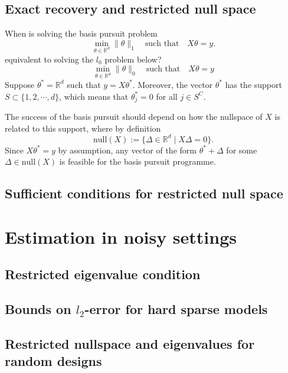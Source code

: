 \documentclass[10pt,handout,english]{beamer}
\newcommand{\R}{\mathbb{R}}
\begin{document}
\subsection{Exact recovery and restricted null space}

\begin{frame}[allowframebreaks]
When is solving the basis pursuit problem
\[
\min_{\theta\in\R^d}\lVert \theta\rVert_1\quad\text{such that}\quad X\theta=y.
\]
equivalent to solving the $l_0$ problem below?
\[
\min_{\theta\in\R^d}\lVert \theta\rVert_0\quad\text{such that}\quad X\theta=y
\]
Suppose $\theta^*=\R^d$ such that $y=X\theta^*$. Moreover, the vector $\theta^*$ has the support $S\subset\{1,2,\cdots,d\}$, which means that $\theta^*_j=0$ for all $j\in S^C$.

The success of the basis pursuit should depend on how the nullspace of $X$ is related to this support, where by definition
\[
\text{null}(X):=\{\Delta\in\R^d\mid X\Delta=0\}.
\]
Since $X\theta^*=y$ by assumption, any vector of the form $\theta^*+\Delta$ for some $\Delta\in\text{null}(X)$ is feasible for the basis pursuit programme.
\end{frame}
\subsection{Sufficient conditions for restricted null space}


\section{Estimation in noisy settings}
\subsection{Restricted eigenvalue condition}

\subsection{Bounds on $l_2$-error for hard sparse models}
\frame{\tableofcontents[currentsubsection]}

\subsection{Restricted nullspace and eigenvalues for random designs}
\frame{\tableofcontents[currentsubsection]}
\end{document}
